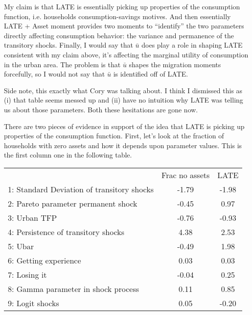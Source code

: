 \documentclass[pdftex,11pt]{article}
\renewcommand{\arraystretch}{.7}
\begin{document}
My claim is that LATE is essentially picking up properties of the consumption function, i.e. households consumption-savings motives. And then essentially LATE + Asset moment provides two moments to ``identify'' the two parameters directly affecting consumption behavior: the variance and permanence of the transitory shocks. Finally, I would say that $\bar u$ does play a role in shaping LATE consistent with my claim above, it's affecting the marginal utility of consumption in the urban area. The problem is that $\bar u$ shapes the migration moments forcefully, so I would not say that $\bar u$ is identified off of LATE.

Side note, this exactly what Cory was talking about. I think I dismissed this as (i) that table seems messed up and (ii) have no intuition why LATE was telling us about those parameters. Both these hesitations are gone now.


There are two pieces of evidence in support of the idea that LATE is picking up properties of the consumption function.  First, let's look at the fraction of households with zero assets and how it depends upon parameter values. This is the first column one in the following table.

\begin{table}[!h]
\footnotesize
\setlength {\tabcolsep}{1.5mm}
\renewcommand{\arraystretch}{2.25}
\begin{center}\label{tb:employment}
\begin{tabular}{l c c}
\hline
\hline
& Frac no assets & LATE \\
1: Standard Deviation of transitory shocks & -1.79   & -1.98  \\
2: Pareto parameter permanent shock &  -0.45         &  0.97  \\
3: Urban TFP &                           -0.76       & -0.93  \\
4: Persistence of transitory shocks &         4.38   &  2.53  \\
5: Ubar &                                    -0.49   &  1.98  \\
6: Getting experience &                       0.03   &  0.03  \\
7: Losing it &                               -0.04   &  0.25  \\
8: Gamma parameter in shock process &         0.11   &  0.85  \\
9: Logit shocks &                             0.05   & -0.20  \\
\hline
\hline
\end{tabular}
\end{center}
\end{table}
\end{document}
